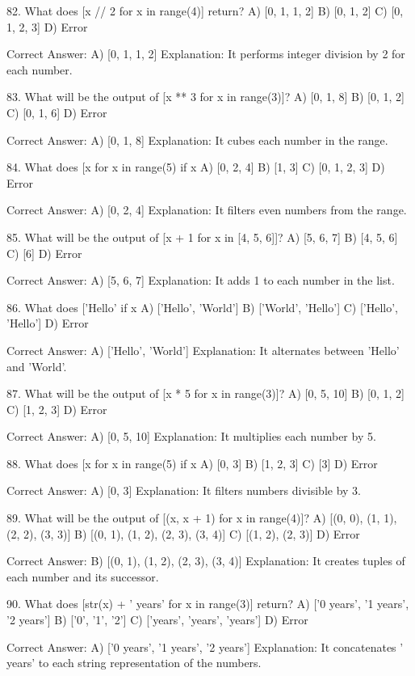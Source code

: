 82. What does [x // 2 for x in range(4)] return?
A) [0, 1, 1, 2]
B) [0, 1, 2]
C) [0, 1, 2, 3]
D) Error

Correct Answer: A) [0, 1, 1, 2]
Explanation: It performs integer division by 2 for each number.

83. What will be the output of [x ** 3 for x in range(3)]?
A) [0, 1, 8]
B) [0, 1, 2]
C) [0, 1, 6]
D) Error

Correct Answer: A) [0, 1, 8]
Explanation: It cubes each number in the range.

84. What does [x for x in range(5) if x %
A) [0, 2, 4]
B) [1, 3]
C) [0, 1, 2, 3]
D) Error

Correct Answer: A) [0, 2, 4]
Explanation: It filters even numbers from the range.

85. What will be the output of [x + 1 for x in [4, 5, 6]]?
A) [5, 6, 7]
B) [4, 5, 6]
C) [6]
D) Error

Correct Answer: A) [5, 6, 7]
Explanation: It adds 1 to each number in the list.

86. What does ['Hello' if x %
A) ['Hello', 'World']
B) ['World', 'Hello']
C) ['Hello', 'Hello']
D) Error

Correct Answer: A) ['Hello', 'World']
Explanation: It alternates between 'Hello' and 'World'.

87. What will be the output of [x * 5 for x in range(3)]?
A) [0, 5, 10]
B) [0, 1, 2]
C) [1, 2, 3]
D) Error

Correct Answer: A) [0, 5, 10]
Explanation: It multiplies each number by 5.

88. What does [x for x in range(5) if x %
A) [0, 3]
B) [1, 2, 3]
C) [3]
D) Error

Correct Answer: A) [0, 3]
Explanation: It filters numbers divisible by 3.

89. What will be the output of [(x, x + 1) for x in range(4)]?
A) [(0, 0), (1, 1), (2, 2), (3, 3)]
B) [(0, 1), (1, 2), (2, 3), (3, 4)]
C) [(1, 2), (2, 3)]
D) Error

Correct Answer: B) [(0, 1), (1, 2), (2, 3), (3, 4)]
Explanation: It creates tuples of each number and its successor.

90. What does [str(x) + ' years' for x in range(3)] return?
A) ['0 years', '1 years', '2 years']
B) ['0', '1', '2']
C) ['years', 'years', 'years']
D) Error

Correct Answer: A) ['0 years', '1 years', '2 years']
Explanation: It concatenates ' years' to each string representation of the numbers.

